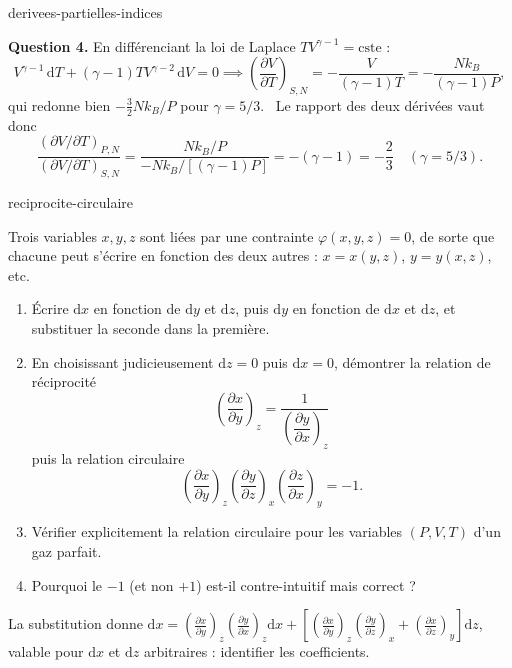 \begin{exo}{derivees-partielles-indices}
\begin{solution}
\textbf{Question 4.} En différenciant la loi de Laplace $TV^{\gamma-1} = \text{cste}$ :
\[
V^{\gamma-1}\,\mathrm{d}T + (\gamma-1)TV^{\gamma-2}\,\mathrm{d}V = 0 \implies \left(\frac{\partial V}{\partial T}\right)_{S,N} = -\frac{V}{(\gamma-1)T} = -\frac{Nk_B}{(\gamma-1)P},
\]
qui redonne bien $-\tfrac{3}{2}Nk_B/P$ pour $\gamma = 5/3$. \checkmark\ Le rapport des deux dérivées vaut donc
\[
\frac{\left(\partial V/\partial T\right)_{P,N}}{\left(\partial V/\partial T\right)_{S,N}} = \frac{Nk_B/P}{-Nk_B/[(\gamma-1)P]} = -(\gamma-1) = -\frac{2}{3} \quad (\gamma = 5/3).
\]
\end{solution}
\end{exo}

\begin{exo}{reciprocite-circulaire}

Trois variables $x, y, z$ sont liées par une contrainte $\varphi(x,y,z) = 0$, de sorte que chacune peut s'écrire en fonction des deux autres : $x = x(y,z)$, $y = y(x,z)$, etc.

\begin{enumerate}
\item Écrire $\mathrm{d}x$ en fonction de $\mathrm{d}y$ et $\mathrm{d}z$, puis $\mathrm{d}y$ en fonction de $\mathrm{d}x$ et $\mathrm{d}z$, et substituer la seconde dans la première.
\item En choisissant judicieusement $\mathrm{d}z = 0$ puis $\mathrm{d}x = 0$, démontrer la relation de réciprocité
\[
\left(\frac{\partial x}{\partial y}\right)_z = \frac{1}{\left(\dfrac{\partial y}{\partial x}\right)_z}
\]
puis la relation circulaire
\[
\left(\frac{\partial x}{\partial y}\right)_z\left(\frac{\partial y}{\partial z}\right)_x\left(\frac{\partial z}{\partial x}\right)_y = -1.
\]
\item Vérifier explicitement la relation circulaire pour les variables $(P, V, T)$ d'un gaz parfait.
\item Pourquoi le $-1$ (et non $+1$) est-il contre-intuitif mais correct ?
\end{enumerate}

\begin{indication}
La substitution donne $\mathrm{d}x = \left(\frac{\partial x}{\partial y}\right)_z\left(\frac{\partial y}{\partial x}\right)_z\mathrm{d}x + \left[\left(\frac{\partial x}{\partial y}\right)_z\left(\frac{\partial y}{\partial z}\right)_x + \left(\frac{\partial x}{\partial z}\right)_y\right]\mathrm{d}z$, valable pour $\mathrm{d}x$ et $\mathrm{d}z$ arbitraires : identifier les coefficients.
\end{indication}


\end{exo}
